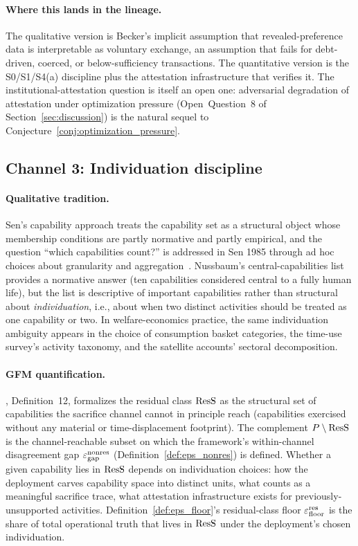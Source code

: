 \paragraph{Where this lands in the lineage.}
The qualitative version is Becker's implicit assumption that
revealed-preference data is interpretable as voluntary
exchange, an assumption that fails for debt-driven, coerced, or
below-sufficiency transactions.  The quantitative version is the
S0/S1/S4(a) discipline plus the attestation infrastructure that
verifies it.  The institutional-attestation question is itself an
open one: adversarial degradation of attestation under
optimization pressure (Open~Question~8 of
Section~\ref{sec:discussion}) is the natural sequel to
Conjecture~\ref{conj:optimization_pressure}.

\subsection{Channel 3: Individuation discipline}
\label{sec:channel_individuation}

\paragraph{Qualitative tradition.}
Sen's capability approach treats the capability set as a structural
object whose membership conditions are partly normative and partly
empirical, and the question ``which capabilities count?'' is
addressed in Sen 1985 through ad hoc choices about granularity
and aggregation~\citep{sen1985commodities,sen1979equality}.
Nussbaum's central-capabilities list~\citep{nussbaum2000women}
provides a normative answer (ten capabilities considered central
to a fully human life), but the list is descriptive of important
capabilities rather than structural about \emph{individuation}, i.e., about
when two distinct activities should be treated as one capability or
two.  In welfare-economics practice, the same individuation
ambiguity appears in the choice of consumption basket categories,
the time-use survey's activity taxonomy, and the satellite
accounts' sectoral decomposition.

\paragraph{GFM quantification.}
\citep[Need~Sufficiency]{lasser2026paper8b}, Definition~12,
formalizes the residual class $\mathrm{ResS}$ as the structural set of
capabilities the sacrifice channel cannot in principle reach
(capabilities exercised without any material or
time-displacement footprint).  The complement $P \setminus \mathrm{ResS}$
is the channel-reachable subset on which the framework's
within-channel disagreement gap $\varepsilon_{\mathrm{gap}}^{\mathrm{nonres}}$
(Definition~\ref{def:eps_nonres}) is defined.  Whether a given
capability lies in $\mathrm{ResS}$ depends on individuation choices: how
the deployment carves capability space into distinct units, what
counts as a meaningful sacrifice trace, what attestation
infrastructure exists for previously-unsupported activities.
Definition~\ref{def:eps_floor}'s residual-class floor $\varepsilon_{\mathrm{floor}}^{\mathrm{res}}$
is the share of total operational truth that lives in
$\mathrm{ResS}$ under the deployment's chosen individuation.

